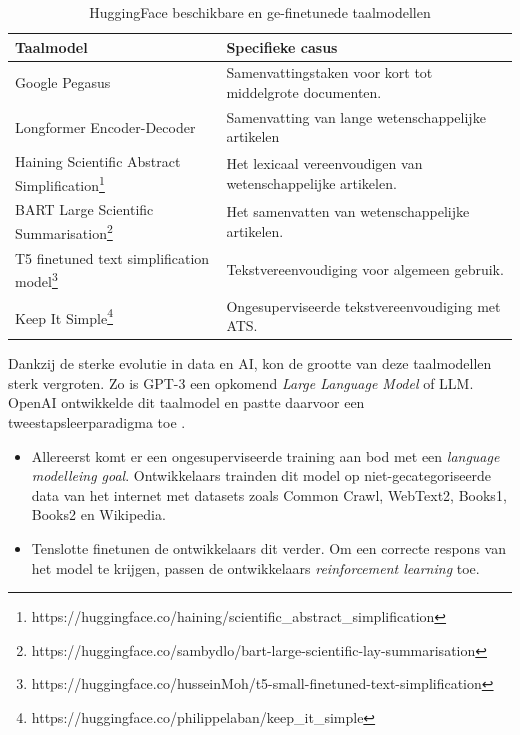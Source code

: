 \begin{center}
	\begin{table}[H]
	\begin{tabular}{ | m{4cm} | m{12cm} | } 
		\hline
		\textbf{Taalmodel} & Specifieke casus \\ \hline
		Google Pegasus & Samenvattingstaken voor kort tot middelgrote documenten. \\
		\hline
		Longformer Encoder-Decoder & Samenvatting van lange wetenschappelijke artikelen \\
		\hline
		Haining Scientific Abstract Simplification\footnote{https://huggingface.co/haining/scientific\_abstract\_simplification} & Het lexicaal vereenvoudigen van wetenschappelijke artikelen. \\
		\hline
		BART Large Scientific Summarisation\footnote{https://huggingface.co/sambydlo/bart-large-scientific-lay-summarisation} & Het samenvatten van wetenschappelijke artikelen. \\
		\hline
		T5 finetuned text simplification model\footnote{https://huggingface.co/husseinMoh/t5-small-finetuned-text-simplification} & Tekstvereenvoudiging voor algemeen gebruik. \\
		\hline
		Keep It Simple\footnote{https://huggingface.co/philippelaban/keep\_it\_simple} & Ongesuperviseerde tekstvereenvoudiging met ATS. \\
		\hline
	\end{tabular}
		\caption{HuggingFace beschikbare en ge-finetunede taalmodellen}
		\label{table:huggingface-models}
	\end{table}
\end{center}

\medspace

Dankzij de sterke evolutie in data en AI, kon de grootte van deze taalmodellen sterk vergroten. Zo is GPT-3 een opkomend \textit{Large Language Model} of LLM. OpenAI ontwikkelde dit taalmodel en pastte daarvoor een tweestapsleerparadigma toe \autocite{Radford2019, Li2022}. 

\begin{itemize}
	\item Allereerst komt er een ongesuperviseerde training aan bod met een \textit{language modelleing goal}. Ontwikkelaars trainden dit model op niet-gecategoriseerde data van het internet met datasets zoals Common Crawl, WebText2, Books1, Books2 en Wikipedia.
	\item Tenslotte finetunen de ontwikkelaars dit verder. Om een correcte respons van het model te krijgen, passen de ontwikkelaars \textit{reinforcement learning} toe.
\end{itemize}


